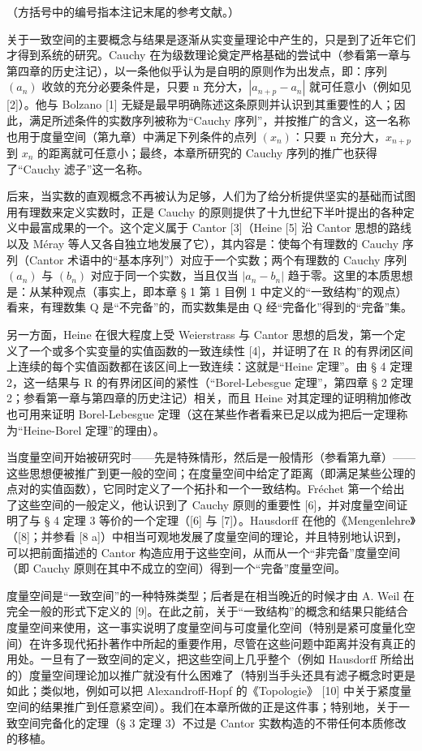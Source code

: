 
（方括号中的编号指本注记末尾的参考文献。）

关于一致空间的主要概念与结果是逐渐从实变量理论中产生的，只是到了近年它们才得到系统的研究。Cauchy 在为级数理论奠定严格基础的尝试中（参看第一章与第四章的历史注记），以一条他似乎认为是自明的原则作为出发点，即：序列 \((a_{n})\) 收敛的充分必要条件是，只要 n 充分大，\(|a_{n+p} - a_{n}|\) 就可任意小（例如见 {[}2{]}）。他与 Bolzano {[}1{]} 无疑是最早明确陈述这条原则并认识到其重要性的人；因此，满足所述条件的实数序列被称为“Cauchy 序列”，并按推广的含义，这一名称也用于度量空间（第九章）中满足下列条件的点列 \((x_{n})\)：只要 n 充分大，\(x_{n+p}\) 到 \(x_{n}\) 的距离就可任意小；最终，本章所研究的 Cauchy 序列的推广也获得了“Cauchy 滤子”这一名称。

后来，当实数的直观概念不再被认为足够，人们为了给分析提供坚实的基础而试图用有理数来定义实数时，正是 Cauchy 的原则提供了十九世纪下半叶提出的各种定义中最富成果的一个。这个定义属于 Cantor {[}3{]}（Heine {[}5{]} 沿 Cantor 思想的路线以及 Méray 等人又各自独立地发展了它），其内容是：使每个有理数的 Cauchy 序列（Cantor 术语中的“基本序列”）对应于一个实数；两个有理数的 Cauchy 序列 \((a_{n})\) 与 \((b_{n})\) 对应于同一个实数，当且仅当 \(|a_{n} - b_{n}|\) 趋于零。这里的本质思想是：从某种观点（事实上，即本章 § 1 第 1 目例 1 中定义的“一致结构”的观点）看来，有理数集 Q 是“不完备”的，而实数集是由 Q 经“完备化”得到的“完备”集。

另一方面，Heine 在很大程度上受 Weierstrass 与 Cantor 思想的启发，第一个定义了一个或多个实变量的实值函数的一致连续性 {[}4{]}，并证明了在 R 的有界闭区间上连续的每个实值函数都在该区间上一致连续：这就是“Heine 定理”。由 § 4 定理 2，这一结果与 R 的有界闭区间的紧性（“Borel-Lebesgue 定理”，第四章 § 2 定理 2；参看第一章与第四章的历史注记）相关，而且 Heine 对其定理的证明稍加修改也可用来证明 Borel-Lebesgue 定理（这在某些作者看来已足以成为把后一定理称为“Heine-Borel 定理”的理由）。

当度量空间开始被研究时——先是特殊情形，然后是一般情形（参看第九章）——这些思想便被推广到更一般的空间；在度量空间中给定了距离（即满足某些公理的点对的实值函数），它同时定义了一个拓扑和一个一致结构。Fréchet 第一个给出了这些空间的一般定义，他认识到了 Cauchy 原则的重要性 {[}6{]}，并对度量空间证明了与 § 4 定理 3 等价的一个定理（{[}6{]} 与 {[}7{]}）。Hausdorff 在他的《Mengenlehre》（{[}8{]}；并参看 {[}8 a{]}）中相当可观地发展了度量空间的理论，并且特别地认识到，可以把前面描述的 Cantor 构造应用于这些空间，从而从一个“非完备”度量空间（即 Cauchy 原则在其中不成立的空间）得到一个“完备”度量空间。

度量空间是“一致空间”的一种特殊类型；后者是在相当晚近的时候才由 A. Weil 在完全一般的形式下定义的 {[}9{]}。在此之前，关于“一致结构”的概念和结果只能结合度量空间来使用，这一事实说明了度量空间与可度量化空间（特别是紧可度量化空间）在许多现代拓扑著作中所起的重要作用，尽管在这些问题中距离并没有真正的用处。一旦有了一致空间的定义，把这些空间上几乎整个（例如 Hausdorff 所给出的）度量空间理论加以推广就没有什么困难了（特别当手头还具有滤子概念时更是如此；类似地，例如可以把 Alexandroff-Hopf 的《Topologie》 {[}10{]} 中关于紧度量空间的结果推广到任意紧空间）。我们在本章所做的正是这件事；特别地，关于一致空间完备化的定理（§ 3 定理 3）不过是 Cantor 实数构造的不带任何本质修改的移植。

